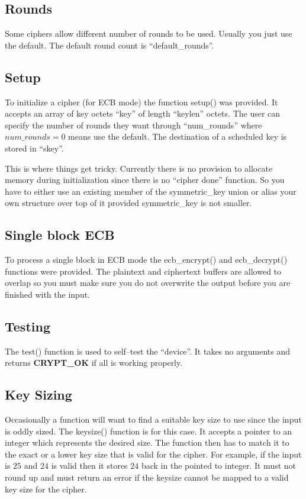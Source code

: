 \documentclass[a4paper]{book}
\begin{document}
\subsection{Rounds}
Some ciphers allow different number of rounds to be used.  Usually you just use the default.  The default round count is ``default\_rounds''.

\subsection{Setup}
To initialize a cipher (for ECB mode) the function setup() was provided.  It accepts an array of key octets ``key'' of length ``keylen'' octets.  The user
can specify the number of rounds they want through ``num\_rounds'' where $num\_rounds = 0$ means use the default.  The destination of a scheduled key is stored
in ``skey''.

This is where things get tricky.  Currently there is no provision to allocate memory during initialization since there is no ``cipher done'' function.  So you have
to either use an existing member of the symmetric\_key union or alias your own structure over top of it provided symmetric\_key is not smaller.

\subsection{Single block ECB}
To process a single block in ECB mode the ecb\_encrypt() and ecb\_decrypt() functions were provided.  The plaintext and ciphertext buffers are allowed to overlap so you 
must make sure you do not overwrite the output before you are finished with the input.

\subsection{Testing}
The test() function is used to self--test the ``device''.  It takes no arguments and returns \textbf{CRYPT\_OK} if all is working properly.

\subsection{Key Sizing}
Occasionally a function will want to find a suitable key size to use since the input is oddly sized.  The keysize() function is for this case.  It accepts a 
pointer to an integer which represents the desired size.  The function then has to match it to the exact or a lower key size that is valid for the cipher.  For
example, if the input is $25$ and $24$ is valid then it stores $24$ back in the pointed to integer.  It must not round up and must return an error if the keysize
 cannot be mapped to a valid key size for the cipher.
\end{document}
